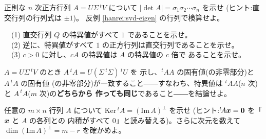 \begin{mondai}[発展]\label{q:svd-ex9}
正則な $n$ 次正方行列 $A = U\Sigma\,{}^tV$ について
$|\det A| = \sigma_1\sigma_2\cdots\sigma_n$ を示せ
(ヒント:直交行列の行列式は $\pm 1$)。
反例 \ref{hanrei:svd-eigen} の行列で検算せよ。
\end{mondai}

\begin{mondai}[発展]\label{q:svd-ex10}
　(1) 直交行列 $Q$ の特異値がすべて $1$ であることを示せ。\\
　(2) 逆に、特異値がすべて $1$ の正方行列は直交行列であることを示せ。\\
　(3) $c > 0$ に対し、$cA$ の特異値は $A$ の特異値の $c$ 倍で
あることを示せ。
\end{mondai}

\begin{mondai}[証明]\label{q:svd-ex11}
$A = U\Sigma\,{}^tV$ のとき $A\,{}^t\!A = U(\Sigma\,{}^t\Sigma)\,{}^tU$ を
示し、${}^t\!AA$ の固有値(の非零部分)と $A\,{}^t\!A$ の固有値
(の非零部分)が一致すること――すなわち、特異値は
${}^t\!AA$($n$ 次)と $A\,{}^t\!A$($m$ 次)の\textbf{どちらから
作っても同じ}であること――を結論せよ。
\end{mondai}

\begin{mondai}[証明]\label{q:svd-ex12}
任意の $m \times n$ 行列 $A$ について
$\mathrm{Ker}\,{}^t\!A = (\mathrm{Im}\,A)^{\perp}$ を示せ
(ヒント:${}^t\!A\bm{x} = \bm{0}$ を「$\bm{x}$ と $A$ の各列との
内積がすべて $0$」と読み替える)。さらに次元を数えて
$\dim(\mathrm{Im}\,A)^{\perp} = m - r$ を確かめよ。
\end{mondai}

